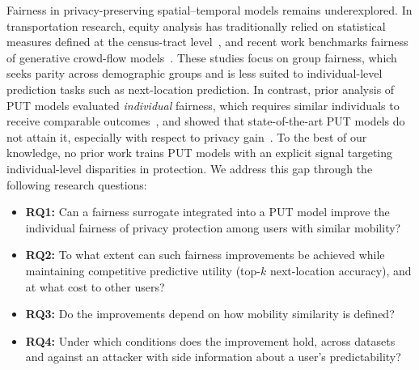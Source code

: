 \documentclass[sigconf,anonymous,review]{acmart}
\begin{document}
Fairness in privacy-preserving spatial--temporal models remains underexplored. In transportation research, equity analysis has traditionally relied on statistical measures defined at the census-tract level~\cite{yan2020fairness,yan2019fairst}, and recent work benchmarks fairness of generative crowd-flow models~\cite{he2025gcf}. These studies focus on group fairness, which seeks parity across demographic groups and is less suited to individual-level prediction tasks such as next-location prediction. In contrast, prior analysis of PUT models evaluated \emph{individual} fairness, which requires similar individuals to receive comparable outcomes~\cite{dwork2012fairness}, and showed that state-of-the-art PUT models do not attain it, especially with respect to privacy gain~\cite{zhan2023fairness}. To the best of our knowledge, no prior work trains PUT models with an explicit signal targeting individual-level disparities in protection. We address this gap through the following research questions:
\begin{itemize}
  \item \textbf{RQ1:} Can a fairness surrogate integrated into a PUT model improve the individual fairness of privacy protection among users with similar mobility?
  \item \textbf{RQ2:} To what extent can such fairness improvements be achieved while maintaining competitive predictive utility (top-$k$ next-location accuracy), and at what cost to other users?
  \item \textbf{RQ3:} Do the improvements depend on how mobility similarity is defined?
  \item \textbf{RQ4:} Under which conditions does the improvement hold, across datasets and against an attacker with side information about a user's predictability?
\end{itemize}
\end{document}
